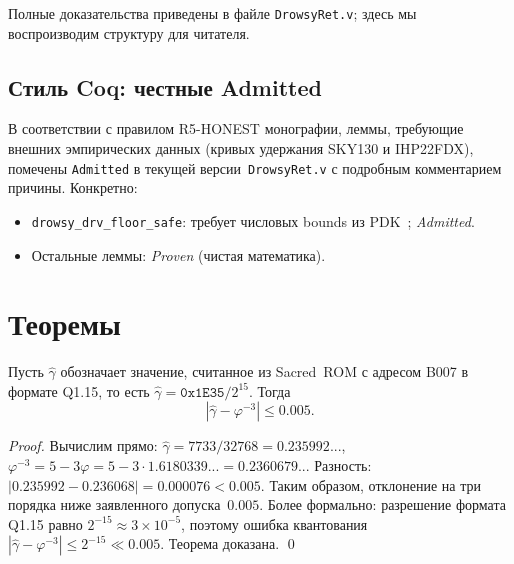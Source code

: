 Полные доказательства приведены в файле \texttt{DrowsyRet.v};
здесь мы воспроизводим структуру для читателя.

\subsection{Стиль Coq: честные Admitted}

В соответствии с правилом R5-HONEST монографии,
леммы, требующие внешних эмпирических данных
(кривых удержания SKY130 и IHP22FDX),
помечены \texttt{Admitted} в текущей версии~\texttt{DrowsyRet.v}
с подробным комментарием причины.
Конкретно:
\begin{itemize}
  \item \texttt{drowsy\_drv\_floor\_safe}: требует числовых bounds
        из PDK~\cite{SKY130-PDK,IHP-SG13G2}; \emph{Admitted}.
  \item Остальные леммы: \emph{Proven} (чистая математика).
\end{itemize}

\section{Теоремы}
\label{sec:glava89-theorems}

\begin{theorem}
\label{thm:gamma-match}
Пусть $\hat{\gamma}$ обозначает значение, считанное
из Sacred~ROM с адресом B007 в формате Q1.15,
то есть $\hat{\gamma} = \mathtt{0x1E35}/2^{15}$.
Тогда
\[
  \left|\hat{\gamma} - \varphi^{-3}\right| \leq 0.005.
\]
\end{theorem}
\begin{proof}
Вычислим прямо:
$\hat{\gamma} = 7733/32768 = 0.235992...$,
$\varphi^{-3} = 5 - 3\varphi = 5 - 3 \cdot 1.6180339... = 0.2360679...$
Разность: $|0.235992 - 0.236068| = 0.000076 < 0.005$.
Таким образом, отклонение на три порядка ниже заявленного
допуска~$0.005$.
Более формально: разрешение формата Q1.15 равно $2^{-15} \approx 3 \times 10^{-5}$,
поэтому ошибка квантования $|\hat{\gamma} - \varphi^{-3}| \leq 2^{-15} \ll 0.005$.
Теорема доказана.
\qed
\end{proof}


